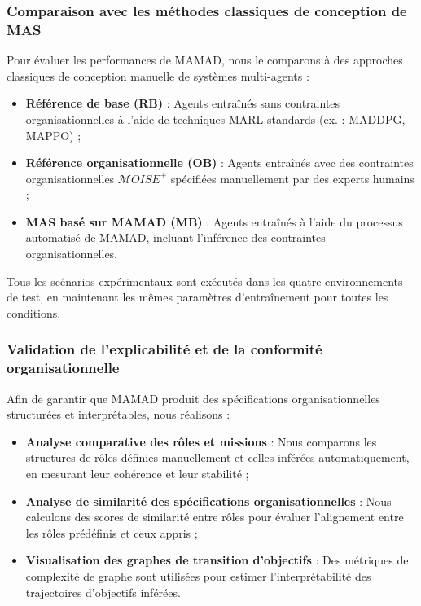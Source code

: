 \documentclass[pdflatex,sn-mathphys-num]{sn-jnl}%
\theoremstyle{thmstyleone}%
\theoremstyle{thmstyletwo}%
\theoremstyle{thmstylethree}%
\begin{document}
\subsubsection{Comparaison avec les méthodes classiques de conception de MAS}

Pour évaluer les performances de MAMAD, nous le comparons à des approches classiques de conception manuelle de systèmes multi-agents :

\begin{itemize}
    \item \textbf{Référence de base (RB)} : Agents entraînés sans contraintes organisationnelles à l'aide de techniques MARL standards (ex. : MADDPG, MAPPO) ;
    \item \textbf{Référence organisationnelle (OB)} : Agents entraînés avec des contraintes organisationnelles $\mathcal{M}OISE^+$ spécifiées manuellement par des experts humains ;
    \item \textbf{MAS basé sur MAMAD (MB)} : Agents entraînés à l'aide du processus automatisé de MAMAD, incluant l'inférence des contraintes organisationnelles.
\end{itemize}

Tous les scénarios expérimentaux sont exécutés dans les quatre environnements de test, en maintenant les mêmes paramètres d'entraînement pour toutes les conditions.

\subsubsection{Validation de l'explicabilité et de la conformité organisationnelle}

Afin de garantir que MAMAD produit des spécifications organisationnelles structurées et interprétables, nous réalisons :

\begin{itemize}
    \item \textbf{Analyse comparative des rôles et missions} : Nous comparons les structures de rôles définies manuellement et celles inférées automatiquement, en mesurant leur cohérence et leur stabilité ;
    \item \textbf{Analyse de similarité des spécifications organisationnelles} : Nous calculons des scores de similarité entre rôles pour évaluer l'alignement entre les rôles prédéfinis et ceux appris ;
    \item \textbf{Visualisation des graphes de transition d'objectifs} : Des métriques de complexité de graphe sont utilisées pour estimer l'interprétabilité des trajectoires d'objectifs inférées.
\end{itemize}
\end{document}
